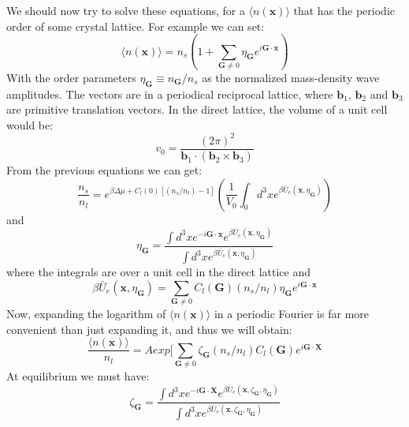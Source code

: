 \documentclass[12pt,a4paper]{article}
\begin{document}
We should now try to solve these equations, for a  $\langle n(\textbf{x})\rangle$ that has the periodic order of some crystal lattice. For example we can set:
\begin{equation}
\langle n(\textbf{x})\rangle = n_s (1+\sum_{\textbf{G} \neq 0} \eta_{\textbf{G}} e^{i \textbf{G} \cdot \textbf{x}})
\end{equation}
With  the order parameters $\eta_{\textbf{G}}\equiv n_{\textbf{G}}/n_s$ as the normalized mass-density wave amplitudes. The vectors are in a periodical reciprocal lattice, where $\textbf{b}_1$, $\textbf{b}_2$ and $\textbf{b}_3$ are primitive translation vectors. In the direct lattice, the volume of a unit cell would be:
\begin{equation}
v_0=\frac{(2\pi)^2}{\textbf{b}_1 \cdot (\textbf{b}_2 \times \textbf{b}_3)}
\end{equation}
From the previous equations we can get:
\begin{equation}
\frac{n_s}{n_l} = e^{\beta \Delta \mu + C_l (0) [ ( n_s /n_l ) -1 ]} 
( \frac{1}{V_0}
\int_0 d^3 x e^{ \beta \bar{U}_e (\textbf{x},\eta_{\textbf{G}} ) } )
\end{equation}
and
\begin{equation}
\eta_{\textbf{G}} = \frac{
\int d^3 x e^{- i \textbf{G} \cdot \textbf{x} }
e^{ \beta \bar{U}_e (\textbf{x},\eta_{\textbf{G}} ) }}
{\int d^3 x e^{ \beta \bar{U}_e (\textbf{x},\eta_{\textbf{G}} ) }}
\end{equation}
where the integrals are over a unit cell in the direct lattice and
\begin{equation}
\beta \bar{U}_e (\textbf{x},\eta_{\textbf{G}} ) = \sum_{\textbf{G}\neq 0} 
C_l(\textbf{G}) ( n_s / n_l ) \eta_{\textbf{G}} e^{i \textbf{G} \cdot \textbf{x}}
\end{equation}
Now, expanding the logarithm of $\langle n(\textbf{x})\rangle$ in a periodic Fourier is far more convenient than just expanding it, and thus we will obtain:
\begin{equation}
\frac{\langle n(\textbf{x})\rangle}{n_l} = A exp [ \sum_{\textbf{G}\neq 0}  \zeta_{\textbf{G}}(n_s/n_l)C_l ( \textbf{G}) e^{i \textbf{G} \cdot \textbf{X}}
\end{equation}
At equilibrium we must have:
\begin{equation}
\zeta_{\textbf{G}} = \frac {
\int d^3 x e^{-i \textbf{G} \cdot \textbf{X}} e^{\beta \bar{U}_e (\textbf{x},\zeta_{\textbf{G}},\eta_{\textbf{G}})} }
{\int d^3 x    e^{\beta \bar{U}_e (\textbf{x},\zeta_{\textbf{G}},\eta_{\textbf{G}})} }
\end{equation}
\end{document}
